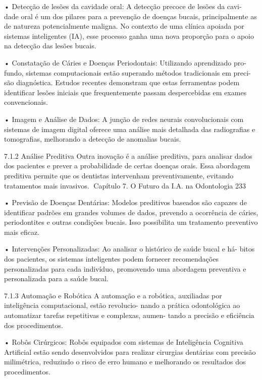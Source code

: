     • Detecção de lesões da cavidade oral: A detecção precoce de lesões da cavi-
      dade oral é um dos pilares para a prevenção de doenças bucais, principalmente
      as de natureza potencialmente maligna. No contexto de uma clínica apoiada por
      sistemas inteligentes (IA), esse processo ganha uma nova proporção para o apoio
      na detecção das lesões bucais.

    • Constatação de Cáries e Doenças Periodontais: Utilizando aprendizado pro-
      fundo, sistemas computacionais estão superando métodos tradicionais em preci-
      são diagnóstica. Estudos recentes demonstram que estas ferramentas podem
      identificar lesões iniciais que frequentemente passam despercebidas em exames
      convencionais.

    • Imagem e Análise de Dados: A junção de redes neurais convolucionais com
      sistemas de imagem digital oferece uma análise mais detalhada das radiografias
      e tomografias, melhorando a detecção de anomalias bucais.

7.1.2    Análise Preditiva
Outra inovação é a análise preditiva, para analisar dados dos pacientes e prever a
probabilidade de certas doenças orais. Essa abordagem preditiva permite que os
dentistas intervenham preventivamente, evitando tratamentos mais invasivos.
Capítulo 7. O Futuro da I.A. na Odontologia                                             233


    • Previsão de Doenças Dentárias: Modelos preditivos baseados são capazes
      de identificar padrões em grandes volumes de dados, prevendo a ocorrência de
      cáries, periodontites e outras condições bucais. Isso possibilita um tratamento
      preventivo mais eficaz.

    • Intervenções Personalizadas: Ao analisar o histórico de saúde bucal e há-
      bitos dos pacientes, os sistemas inteligentes podem fornecer recomendações
      personalizadas para cada indivíduo, promovendo uma abordagem preventiva e
      personalizada para a saúde bucal.

7.1.3     Automação e Robótica
A automação e a robótica, auxiliadas por inteligência computacional, estão revolucio-
nando a prática odontológica ao automatizar tarefas repetitivas e complexas, aumen-
tando a precisão e eficiência dos procedimentos.

    • Robôs Cirúrgicos: Robôs equipados com sistemas de Inteligência Cognitiva
      Artificial estão sendo desenvolvidos para realizar cirurgias dentárias com precisão
      milimétrica, reduzindo o risco de erro humano e melhorando os resultados dos
      procedimentos.

